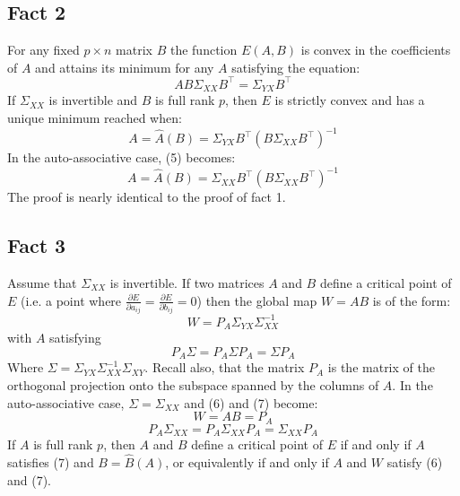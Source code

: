 \subsection{Fact 2}
For any fixed $p \times n$ matrix $B$ the function $E(A,B)$ is convex in the coefficients of $A$ and attains its minimum for any $A$ satisfying the equation:
\begin{equation} \tag{4}
    AB\Sigma_{XX}B^\intercal= \Sigma_{YX}B^\intercal 
\end{equation}
If $\Sigma_{XX}$ is invertible and $B$ is full rank $p$, then $E$ is strictly convex and has a unique minimum reached when:
\begin{equation} \tag{5}
    A = \hat{A}(B) = \Sigma_{YX}B^\intercal (B\Sigma_{XX}B^\intercal)^{-1}
\end{equation}
In the auto-associative case, (5) becomes:
\begin{equation} \tag{5'}
    A = \hat{A}(B) = \Sigma_{XX}B^\intercal (B\Sigma_{XX}B^\intercal)^{-1}
\end{equation}
The proof is nearly identical to the proof of fact 1.




\subsection{Fact 3}
Assume that $\Sigma_{XX}$ is invertible. If two matrices $A$ and $B$ define a critical point of $E$ (i.e. a point where $\frac{\partial E}{\partial a_{ij}} = \frac{\partial E}{\partial b_{ij}} = 0$) then the global map $W = AB$ is of the form:
\begin{equation} \tag{6}
    W = P_A \Sigma_{YX}\Sigma_{XX}^{-1}
\end{equation}
with $A$ satisfying
\begin{equation} \tag{7}
    P_A \Sigma = P_A \Sigma P_A = \Sigma P_A    
\end{equation}
Where $\Sigma = \Sigma_{YX} \Sigma_{XX}^{-1} \Sigma_{XY}$. Recall also, that the matrix $P_A$ is the matrix of the orthogonal projection onto the subspace spanned by the columns of $A$. In the auto-associative case, $\Sigma = \Sigma_{XX}$ and (6) and (7) become:
\begin{equation} \tag{6'}
    W = AB = P_A
\end{equation}
\begin{equation} \tag{7'}
    P_A \Sigma_{XX} = P_A \Sigma_{XX} P_A = \Sigma_{XX} P_A
\end{equation}
If $A$ is full rank $p$, then $A$ and $B$ define a critical point of $E$ if and only if $A$ satisfies (7) and $B = \hat{B}(A)$, or equivalently if and only if $A$ and $W$ satisfy (6) and (7).

